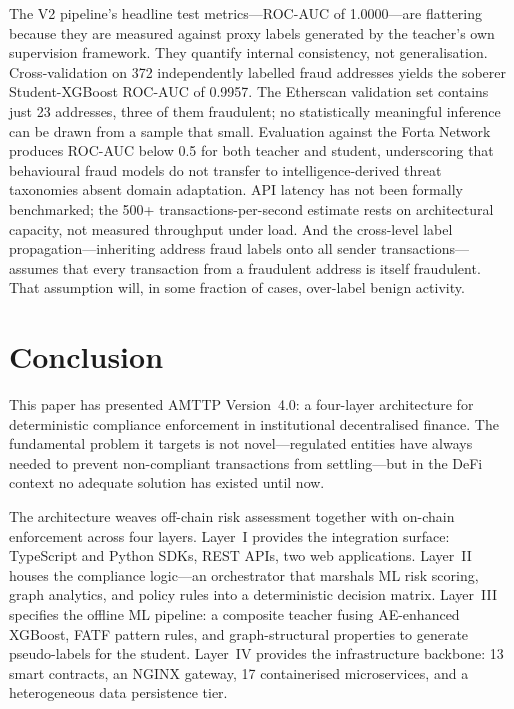\documentclass[journal]{IEEEtran}
\begin{document}
The V2 pipeline's headline test metrics---ROC-AUC of 1.0000---are flattering because they are measured against proxy labels generated by the teacher's own supervision framework. They quantify internal consistency, not generalisation. Cross-validation on 372 independently labelled fraud addresses yields the soberer Student-XGBoost ROC-AUC of 0.9957. The Etherscan validation set contains just 23 addresses, three of them fraudulent; no statistically meaningful inference can be drawn from a sample that small. Evaluation against the Forta Network produces ROC-AUC below 0.5 for both teacher and student, underscoring that behavioural fraud models do not transfer to intelligence-derived threat taxonomies absent domain adaptation. API latency has not been formally benchmarked; the 500+ transactions-per-second estimate rests on architectural capacity, not measured throughput under load. And the cross-level label propagation---inheriting address fraud labels onto all sender transactions---assumes that every transaction from a fraudulent address is itself fraudulent. That assumption will, in some fraction of cases, over-label benign activity.

\section{Conclusion}

This paper has presented AMTTP Version~4.0: a four-layer architecture for deterministic compliance enforcement in institutional decentralised finance. The fundamental problem it targets is not novel---regulated entities have always needed to prevent non-compliant transactions from settling---but in the DeFi context no adequate solution has existed until now.

The architecture weaves off-chain risk assessment together with on-chain enforcement across four layers. Layer~I provides the integration surface: TypeScript and Python SDKs, REST APIs, two web applications. Layer~II houses the compliance logic---an orchestrator that marshals ML risk scoring, graph analytics, and policy rules into a deterministic decision matrix. Layer~III specifies the offline ML pipeline: a composite teacher fusing AE-enhanced XGBoost, FATF pattern rules, and graph-structural properties to generate pseudo-labels for the student. Layer~IV provides the infrastructure backbone: 13 smart contracts, an NGINX gateway, 17 containerised microservices, and a heterogeneous data persistence tier.
\end{document}
